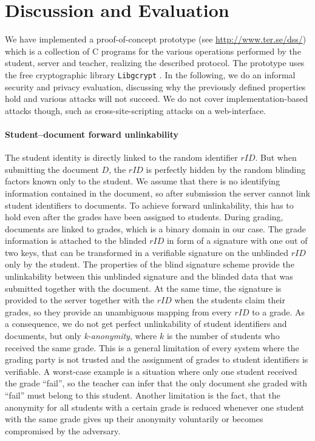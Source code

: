 \section{Discussion and Evaluation}
    \label{section:document-submission-system:evaluation}
We have implemented a proof-of-concept prototype (see \url{http://www.ter.se/dss/}) %
which is a collection of C programs 
for the various operations performed by the student, server and teacher, realizing 
the described protocol. The prototype uses the free cryptographic library \texttt{Libgcrypt} \cite{fsf07}. 
%
In the following, we do an informal security and privacy evaluation,
discussing why the previously defined properties hold and various
attacks will not succeed. We do not cover implementation-based attacks
though, such as cross-site-scripting attacks on a web-interface.

\paragraph{Student--document forward unlinkability}
The student identity is directly linked to the random identifier $rID$. 
But when submitting the document $D$, the $rID$ is perfectly hidden by the
random blinding factors known only to the student.
We assume that there is no identifying information contained in the
document, so after submission the server cannot link
student identifiers to documents.
To achieve forward unlinkability, this has to hold even after the grades
have been assigned to students.  
During grading, documents are linked to grades, which is a binary domain in our
case. The grade information is attached to the blinded $rID$ in form of 
a signature with one out of two keys, that can be transformed in a verifiable
signature on the unblinded $rID$ only by the student. The properties of the
blind signature scheme provide the unlinkability between this unblinded
signature and the blinded data that was submitted together with the document.
At the same time, the signature is provided to the server together with the $rID$ 
when the students claim their grades, so they provide an unambiguous
mapping from every $rID$ to a grade. As a consequence, we do not get
perfect unlinkability of student identifiers and documents, but only
\emph{k-anonymity}, where $k$ is the number of students who received the same
grade. This is a general limitation of every system where the grading
party is not trusted and the assignment of grades to student identifiers 
is verifiable. A worst-case example is a situation
where only one student received the grade ``fail'', so the
teacher can infer that the only document she graded with ``fail''
must belong to this student.
Another limitation is the fact, that the anonymity for all students with
a certain grade is reduced whenever one student with the same grade
gives up their anonymity voluntarily or becomes compromised by the
adversary.


